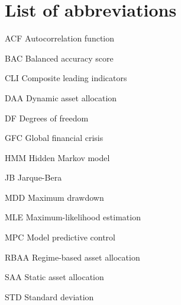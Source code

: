 \section*{List of abbreviations}

\begin{abbrv}
\item[ACF] Autocorrelation function
\item[BAC] Balanced accuracy score
\item[CLI] Composite leading indicators
\item[DAA] Dynamic asset allocation
\item[DF] Degrees of freedom
\item[GFC] Global financial crisis
\item[HMM] Hidden Markov model
\item[JB] Jarque-Bera
\item[MDD] Maximum drawdown
\item[MLE] Maximum-likelihood estimation
\item[MPC] Model predictive control
\item[RBAA] Regime-based asset allocation
\item[SAA] Static asset allocation
\item[STD] Standard deviation
\
\end{abbrv}
